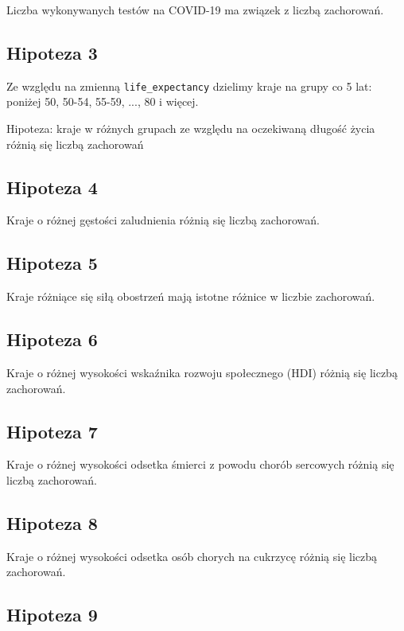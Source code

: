 \documentclass[12pt]{mwbk}
\theoremstyle{plain}
\theoremstyle{definition}
\theoremstyle{remark}
\begin{document}
Liczba wykonywanych testów na COVID-19 ma związek z liczbą zachorowań.

\subsection{Hipoteza 3}

Ze względu na zmienną \texttt{life\_expectancy} dzielimy kraje na grupy co 5 lat: poniżej 50, 50-54, 55-59, ..., 80 i więcej.

Hipoteza: kraje w różnych grupach ze względu na oczekiwaną długość życia różnią się liczbą zachorowań

\subsection{Hipoteza 4}

Kraje o różnej gęstości zaludnienia różnią się liczbą zachorowań.

\subsection{Hipoteza 5}

Kraje różniące się siłą obostrzeń mają istotne różnice w liczbie zachorowań.


\subsection{Hipoteza 6}

Kraje o różnej wysokości wskaźnika rozwoju społecznego (HDI) różnią się liczbą zachorowań.

\subsection{Hipoteza 7}

Kraje o różnej wysokości odsetka śmierci z powodu chorób sercowych różnią się liczbą zachorowań.

\subsection{Hipoteza 8}

Kraje o różnej wysokości odsetka osób chorych na cukrzycę różnią się liczbą zachorowań.

\subsection{Hipoteza 9}
\end{document}
